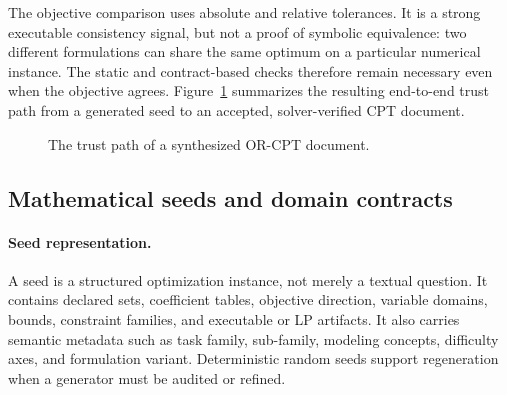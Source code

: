 The objective comparison uses absolute and relative tolerances.  It is a strong
executable consistency signal, but not a proof of symbolic equivalence: two
different formulations can share the same optimum on a particular numerical
instance. The static and contract-based checks therefore remain necessary even
when the objective agrees. Figure~\ref{fig:orcpt-trust-path} summarizes the
resulting end-to-end trust path from a generated seed to an accepted,
solver-verified CPT document.

\begin{figure}[H]
  \centering
  \caption{The trust path of a synthesized OR-CPT document.}
  \label{fig:orcpt-trust-path}
\end{figure}

\subsection{Mathematical seeds and domain contracts}
\label{app:orcpt-contracts}

\paragraph{Seed representation.}
A seed is a structured optimization instance, not merely a textual question.
It contains declared sets, coefficient tables, objective direction, variable
domains, bounds, constraint families, and executable or LP artifacts.  It also
carries semantic metadata such as task family, sub-family, modeling concepts,
difficulty axes, and formulation variant.  Deterministic random seeds support
regeneration when a generator must be audited or refined.


